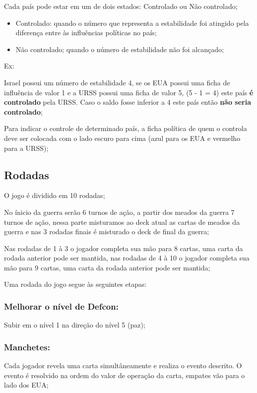 \documentclass[11pt]{article}
\begin{document}
Cada país pode estar em um de dois estados: Controlado ou Não controlado;

\begin{itemize}
\item Controlado: quando o número que representa a estabilidade foi atingido pela diferença entre às influências políticas no país;

\item Não controlado; quando o número de estabilidade não foi alcançado;
\end{itemize}

Ex:

Israel possui um número de estabilidade 4, se os EUA possui uma ficha de influência de valor 1 e a URSS possui uma ficha de valor 5, (5 - 1 = 4) este país \textbf{é controlado} pela URSS. Caso o saldo fosse inferior a 4 este país então
\textbf{não seria controlado};

Para indicar o controle de determinado país, a ficha política de quem o controla deve ser colocada com o lado escuro para cima (azul para os EUA e vermelho para a URSS);

\subsection{Rodadas}
\label{sec:org8f8a8c6}

O jogo é dividido em 10 rodadas;

No ínicio da guerra serão 6 turnos de ação, a partir dos meados da guerra 7 turnos de ação, nessa parte misturamos ao deck atual as cartas de meados da guerra e nas 3 rodadas finais é misturado o deck de final da guerra;

Nas rodadas de 1 à 3 o jogador completa sua mão para 8 cartas, uma carta da rodada anterior pode ser mantida, nas rodadas de 4 à 10 o jogador completa sua mão para 9 cartas, uma carta da rodada anterior pode ser mantida;

Uma rodada do jogo segue às seguintes etapas:

\subsubsection{Melhorar o nível de Defcon:}
\label{sec:orge67202d}
Subir em o nível 1 na direção do nível 5 (paz);

\subsubsection{Manchetes:}
\label{sec:org434df50}
Cada jogador revela uma carta simultâneamente e realiza o evento descrito. O evento é resolvido na ordem do valor de operação da carta, empates vão para o lado dos EUA;
\end{document}

